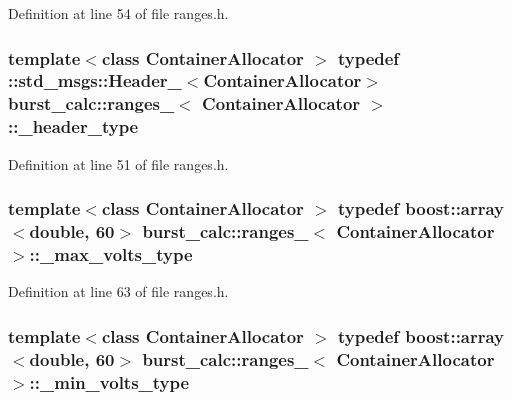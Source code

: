 \-Definition at line 54 of file ranges.\-h.

\subsubsection[{\-\_\-header\-\_\-type}]{\setlength{\rightskip}{0pt plus 5cm}template$<$class Container\-Allocator $>$ typedef \-::std\-\_\-msgs\-::\-Header\-\_\-$<$\-Container\-Allocator$>$ {\bf burst\-\_\-calc\-::ranges\-\_\-}$<$ \-Container\-Allocator $>$\-::{\bf \-\_\-header\-\_\-type}}\label{structburst__calc_1_1ranges___a1fd77845936e232b805fb750b2c0326b}


\-Definition at line 51 of file ranges.\-h.

\subsubsection[{\-\_\-max\-\_\-volts\-\_\-type}]{\setlength{\rightskip}{0pt plus 5cm}template$<$class Container\-Allocator $>$ typedef boost\-::array$<$double, 60$>$ {\bf burst\-\_\-calc\-::ranges\-\_\-}$<$ \-Container\-Allocator $>$\-::{\bf \-\_\-max\-\_\-volts\-\_\-type}}\label{structburst__calc_1_1ranges___a1fb74ff0bef95597884a04e415724dac}


\-Definition at line 63 of file ranges.\-h.

\subsubsection[{\-\_\-min\-\_\-volts\-\_\-type}]{\setlength{\rightskip}{0pt plus 5cm}template$<$class Container\-Allocator $>$ typedef boost\-::array$<$double, 60$>$ {\bf burst\-\_\-calc\-::ranges\-\_\-}$<$ \-Container\-Allocator $>$\-::{\bf \-\_\-min\-\_\-volts\-\_\-type}}\label{structburst__calc_1_1ranges___a12fcc155561aabde1e538fc24bd05f8e}


